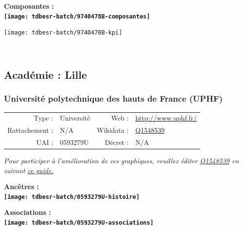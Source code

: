 \documentclass[12pt,french,]{article}
\begin{document}
\hrulefill

\begin{center} \bf Composantes : \\  
\texttt{[image: tdbesr-batch/9740478B-composantes]} \end{center}

\begin{center}\texttt{[image: tdbesr-batch/9740478B-kpi]} \end{center}\checkoddpage

\ifoddpage ~\newpage \fi   

\hypertarget{acaduxe9mie-lille}{%
\subsection{Académie : Lille}\label{acaduxe9mie-lille}}

\hypertarget{universituxe9-polytechnique-des-hauts-de-france-uphf}{%
\subsubsection{Université polytechnique des hauts de France
(UPHF)}\label{universituxe9-polytechnique-des-hauts-de-france-uphf}}

\begin{tabular*}{\textwidth}{rp{5cm}rl}  
\hline  
Type : & Université & Web : &\href{http://www.uphf.fr/}{http://www.uphf.fr/} \\  
Rattachement : & N/A & Wikidata : & \href{https://www.wikidata.org/entity/Q1548539}{Q1548539} \\  
UAI : & 0593279U & Décret : & N/A \\  
\hline  
\end{tabular*}

\textit{\scriptsize Pour participer à l'amélioration de ces graphiques, veuillez éditer  \href{https://www.wikidata.org/entity/Q1548539}{Q1548539}  en suivant \href{https://github.com/cpesr/wikidataESR/blob/master/Rmd/wikidataESR.md}{ce guide.}}

\vspace{1cm}  
\begin{minipage}[b]{0.50\textwidth}\begin{center} \bf Ancêtres : \\  
\texttt{[image: tdbesr-batch/0593279U-histoire]} \end{center}\end{minipage}\begin{minipage}[b]{0.50\textwidth}\begin{center} \bf Associations : \\  
\texttt{[image: tdbesr-batch/0593279U-associations]} \end{center}\end{minipage}
\end{document}
